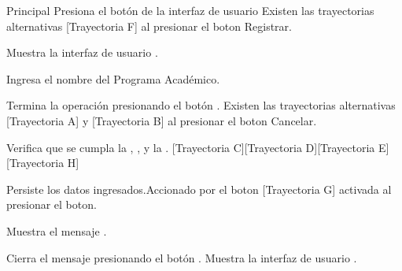 \begin{UCtrayectoria}{Principal}
    \UCpaso[\UCactor] Presiona el botón de la interfaz de usuario Existen las trayectorias alternativas [Trayectoria F] al presionar el boton Registrar.

    \UCpaso Muestra la interfaz de usuario .

    \UCpaso[\UCactor] Ingresa el nombre del Programa Académico.

    \UCpaso[\UCactor] Termina la operación presionando el botón . Existen las trayectorias alternativas [Trayectoria A] y [Trayectoria B] al presionar el boton Cancelar.

    \UCpaso Verifica que se cumpla la , ,  y la . [Trayectoria C][Trayectoria D][Trayectoria E][Trayectoria H]

    \UCpaso Persiste los datos ingresados.Accionado por el boton  [Trayectoria G] activada al presionar el boton.

    \UCpaso Muestra el mensaje .

    \UCpaso[\UCactor] Cierra el mensaje presionando el botón .
    \UCpaso Muestra la interfaz de usuario .
\end{UCtrayectoria}

